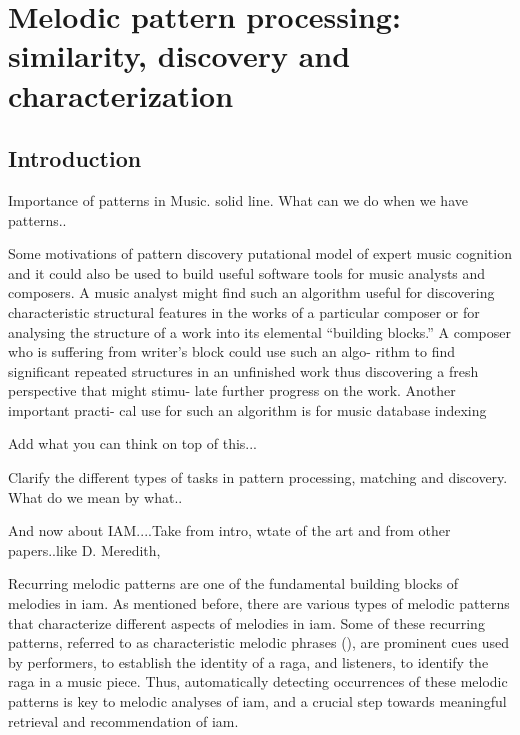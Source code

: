 
\chapter{Melodic pattern processing: similarity, discovery and characterization}
\label{chap:melodic_pattern_processing}

\section{Introduction}
\label{sec:patterns_introduction}



Importance of patterns in Music. solid line. What can we do when we have patterns..

Some motivations of pattern discovery putational model of expert music cognition and it could also
be used to build useful software tools for music analysts and
composers. A music analyst might find such an algorithm
useful for discovering characteristic structural features in the
works of a particular composer or for analysing the structure
of a work into its elemental “building blocks.” A composer
who is suffering from writer’s block could use such an algo-
rithm to find significant repeated structures in an unfinished
work thus discovering a fresh perspective that might stimu-
late further progress on the work. Another important practi-
cal use for such an algorithm is for music database indexing

Add what you can think on top of this...


Clarify the different types of tasks in pattern processing, matching and discovery. What do we mean by what..

And now about IAM....Take from intro, wtate of the art and from other papers..like D. Meredith, 

Recurring melodic patterns are one of the fundamental building blocks of melodies in \gls{iam}. As mentioned before, there are various types of melodic patterns that characterize different aspects of melodies in \gls{iam}. Some of these recurring patterns, referred to as characteristic melodic phrases (), are prominent cues used by performers, to establish the identity of a \gls{raga}, and listeners, to identify the \gls{raga} in a music piece. Thus, automatically detecting occurrences of these melodic patterns is key to melodic analyses of \gls{iam}, and a crucial step towards meaningful retrieval and recommendation of \gls{iam}.

